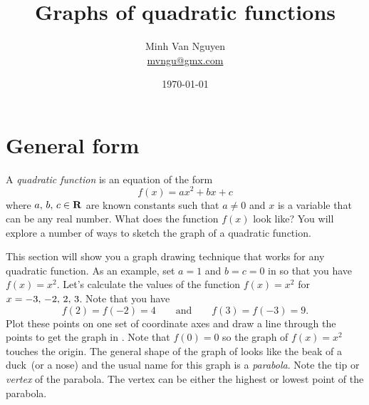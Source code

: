 \documentclass[a4paper,oneside,12pt]{article}
\begin{document}
\title{\Large\bf Graphs of quadratic functions}
\author{%
  Minh Van Nguyen \\
  \url{mvngu@gmx.com}
}
\date{\today}
\maketitle



\section{General form}
\label{sec:general_form}

A \emph{quadratic function} is an equation of the form
\begin{equation}
\label{eqn:general_quadratic_function}
f(x)
=
ax^2 + bx + c
\end{equation}
where ${a},\, {b},\, {c} \in \mathbf{R}$ are known constants such that
$a \neq 0$ and $x$ is a variable that can be any real number.  What
does the function $f(x)$ look like?  You will explore a number of ways
to sketch the graph of a quadratic function.

This section will show you a graph drawing technique that works for
any quadratic function.  As an example, set $a = 1$ and $b = c = 0$ in
 so that you have
$f(x) = x^2$.  Let's calculate the values of the function
$f(x) = x^2$ for $x = {-3},\, {-2},\, {2},\, {3}$.  Note that you
have
\[
f(2) = f(-2) = 4
\qquad
\text{and}
\qquad
f(3) = f(-3) = 9.
\]
Plot these points on one set of coordinate axes and draw a line
through the points to get the graph in .
Note that $f(0) = 0$ so the graph of $f(x) = x^2$ touches the origin.
The general shape of the graph of
 looks like the beak of a
duck~(or a nose) and the usual name for this graph is a
\emph{parabola}.  Note the tip or \emph{vertex} of the parabola.  The
vertex can be either the highest or lowest point of the parabola.
\end{document}
